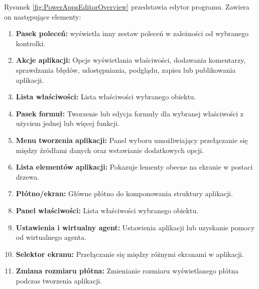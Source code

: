 Rysunek \ref{fig:PowerAppsEditorOverview} przedstawia edytor programu. Zawiera on następujące elementy:
\begin{enumerate}
    \item \textbf{Pasek poleceń:} wyświetla inny zestaw poleceń w zależności od wybranego kontrolki.
    \item \textbf{Akcje aplikacji:} Opcje wyświetlania właściwości, dodawania komentarzy, sprawdzania błędów, udostępniania, podglądu, zapisu lub publikowania aplikacji.
    \item \textbf{Lista właściwości:} Lista właściwości wybranego obiektu.
    \item \textbf{Pasek formuł:} Tworzenie lub edycja formuły dla wybranej właściwości z użyciem jednej lub więcej funkcji.
    \item \textbf{Menu tworzenia aplikacji:} Panel wyboru umożliwiający przełączanie się między źródłami danych oraz wstawianie dodatkowych opcji.
    \item \textbf{Lista elementów aplikacji:} Pokazuje lementy obecne na ekranie w postaci drzewa.
    \item \textbf{Płótno/ekran:} Główne płótno do komponowania struktury aplikacji.
    \item \textbf{Panel właściwości:} Lista właściwości wybranego obiektu.
    \item \textbf{Ustawienia i wirtualny agent:} Ustawienia aplikacji lub uzyskanie pomocy od wirtualnego agenta.
    \item \textbf{Selektor ekranu:} Przełączanie się między różnymi ekranami w aplikacji.
    \item \textbf{Zmiana rozmiaru płótna:} Zmienianie rozmiaru wyświetlanego płótna podczas tworzenia aplikacji.
\end{enumerate}


